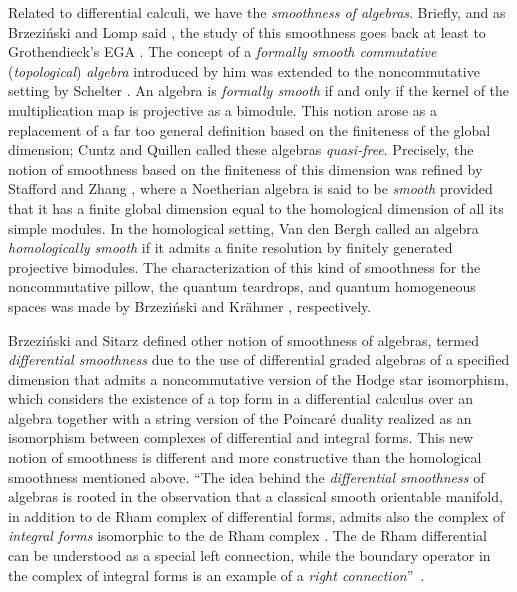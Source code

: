 \documentclass{amsart}
\theoremstyle{definition}
\theoremstyle{remark}
\numberwithin{equation}{section}
\begin{document}
Related to differential calculi, we have the {\em smoothness of algebras}. Briefly, and as Brzezi\'nski and Lomp said \cite[Section 1]{BrzezinskiLomp2018}, the study of this smoothness goes back at least to Grothendieck's EGA \cite{Grothendieck1964}. The concept of a {\em formally smooth commutative} ({\em topological}) {\em algebra} introduced by him was extended to the noncommutative setting by Schelter \cite{Schelter1986}. An algebra is {\em formally smooth} if and only if the kernel of the multiplication map is projective as a bimodule. This notion arose as a replacement of a far too general definition based on the finiteness of the global dimension; Cuntz and Quillen \cite{CuntzQuillen1995} called these algebras {\em quasi-free}. Precisely, the notion of smoothness based on the finiteness of this dimension was refined by Stafford and Zhang \cite{StaffordZhang1994}, where a Noetherian algebra is said to be {\em smooth} provided that it has a finite global dimension equal to the homological dimension of all its simple modules. In the homological setting, Van den Bergh \cite{VandenBergh1998} called an algebra {\em homologically smooth} if it admits a finite resolution by finitely generated projective bimodules. The characterization of this kind of smoothness for the noncommutative pillow, the quantum teardrops, and quantum homogeneous spaces was made by Brzezi{\'n}ski \cite{Brzezinski2008, Brzezinski2014} and Kr\"ahmer \cite{Krahmer2012}, respectively.

Brzezi{\'n}ski and Sitarz \cite{BrzezinskiSitarz2017} defined other notion of smoothness of algebras, termed {\em differential smoothness} due to the use of differential graded algebras of a specified dimension that admits a noncommutative version of the Hodge star isomorphism, which considers the existence of a top form in a differential calculus over an algebra together with a string version of the Poincar\'e duality realized as an isomorphism between complexes of differential and integral forms. This new notion of smoothness is different and more constructive than the homological smoothness mentioned above. \textquotedblleft The idea behind the {\em differential smoothness} of algebras is rooted in the observation that a classical smooth orientable manifold, in addition to de Rham complex of differential forms, admits also the complex of {\em integral forms} isomorphic to the de Rham complex \cite[Section 4.5]{Manin1997}. The de Rham differential can be understood as a special left connection, while the boundary operator in the complex of integral forms is an example of a {\em right connection}\textquotedblright\ \cite[p. 413]{BrzezinskiSitarz2017}.
\end{document}
